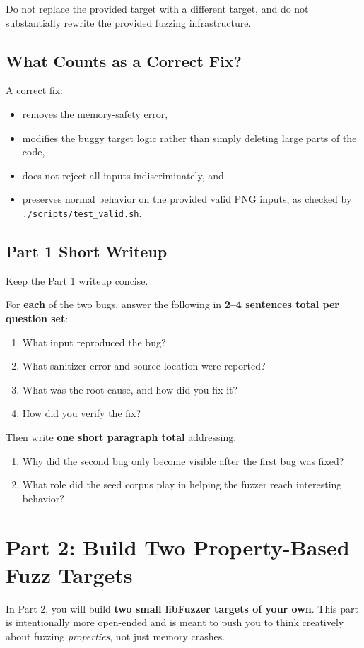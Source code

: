 \documentclass[11pt]{article}
\begin{document}
Do not replace the provided target with a different target, and do not substantially rewrite the provided fuzzing infrastructure.

\subsection*{What Counts as a Correct Fix?}
A correct fix:
\begin{itemize}
    \item removes the memory-safety error,
    \item modifies the buggy target logic rather than simply deleting large parts of the code,
    \item does not reject all inputs indiscriminately, and
    \item preserves normal behavior on the provided valid PNG inputs, as checked by \texttt{./scripts/test\_valid.sh}.
\end{itemize}

\subsection*{Part 1 Short Writeup}
Keep the Part 1 writeup concise.

For \textbf{each} of the two bugs, answer the following in \textbf{2--4 sentences total per question set}:
\begin{enumerate}
    \item What input reproduced the bug?
    \item What sanitizer error and source location were reported?
    \item What was the root cause, and how did you fix it?
    \item How did you verify the fix?
\end{enumerate}

Then write \textbf{one short paragraph total} addressing:
\begin{enumerate}
    \item Why did the second bug only become visible after the first bug was fixed?
    \item What role did the seed corpus play in helping the fuzzer reach interesting behavior?
\end{enumerate}

\section*{Part 2: Build Two Property-Based Fuzz Targets}
In Part 2, you will build \textbf{two small libFuzzer targets of your own}. This part is intentionally more open-ended and is meant to push you to think creatively about fuzzing \emph{properties}, not just memory crashes.
\end{document}
